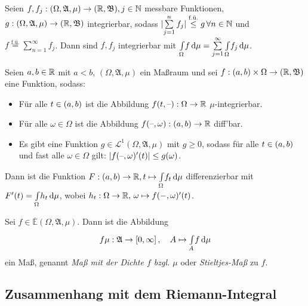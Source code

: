 \documentclass{cheat-sheet}
\newcommand{\Alg}{\mathfrak{A}} %
\newcommand{\Bor}{\mathfrak{B}} %
\newcommand{\E}{\mathbb{E}} %
\newcommand{\Leb}{\mathcal{L}} %
\newcommand{\fue}{\overset{\text{f.ü.}}} %
\theoremstyle{definition}
\newcommand{\IntOmu}[1]{\Int{\Omega}{}{#1}{\mu}} %
\begin{document}
\begin{satz}\begin{doublespace}
  Seien $f, f_j : (\Omega, \Alg, \mu) \to (\R, \Bor), j \in \N$ messbare Funktionen, $g : (\Omega, \Alg, \mu) \to (\R, \Bor)$ integrierbar, sodass $\abs{\sum_{j=1}^n f_j} \overset{\text{f.ü.}}\leq g \, \forall n \in \N$ und\\[-5pt]
  $f \fue= \sum_{n=1}^\infty f_j$. Dann sind $f, f_j$ integrierbar mit $\IntOmu{f} = \sum_{j=1}^\infty \IntOmu{f_j}$.
\end{doublespace}\end{satz}

\vspace{-20pt}

\begin{satz}
  Seien $a, b \in \mathbb{R}$ mit $a \!<\! b$, $(\Omega, \Alg, \mu)$ ein Maßraum und sei $f : \ointerval{a}{b} \times \Omega \to (\R, \Bor)$ eine Funktion, sodass:
  \begin{itemize}
    \item Für alle $t \in \left( a, b \right)$ ist die Abbildung $f(t, \text{--}) : \Omega \to \mathbb{R}$ $\mu$-integrierbar.
    \item Für alle $\omega \in \Omega$ ist die Abbildung $f(\text{--}, \omega) : \left( a, b \right) \to \mathbb{R}$ diff'bar.
    \item Es gibt eine Funktion $g \in \Leb^1(\Omega, \Alg, \mu)$ mit $g \geq 0$, sodass für alle $t \in \left( a, b \right)$ und fast alle $\omega \in \Omega$ gilt: $\lvert f(\text{--}, \omega)'(t)\rvert \leq g(\omega)$.
  \end{itemize}
  Dann ist die Funktion $F : \ointerval{a}{b} \to \R, t \mapsto \IntOmu{f_t}$ differenzierbar mit\\[-3pt]
  $F'(t) = \IntOmu{h_t}$, wobei $h_t : \Omega \to \mathbb{R}, \, \omega \mapsto f(-, \omega)'(t)$.
\end{satz}

\begin{samepage}

\begin{satz}
  Sei $f \in \overline{\E}(\Omega, \Alg, \mu)$. Dann ist die Abbildung
  \[ f \mu : \Alg \to \cinterval{0}{\infty}, \quad A \mapsto \Int{A}{}{f}{\mu} \]
  ein Maß, genannt \emph{Maß mit der Dichte $f$ bzgl. $\mu$} oder \emph{Stieltjes-Maß} zu $f$.
\end{satz}

\subsection{Zusammenhang mit dem Riemann-Integral}

\end{samepage}
\end{document}
